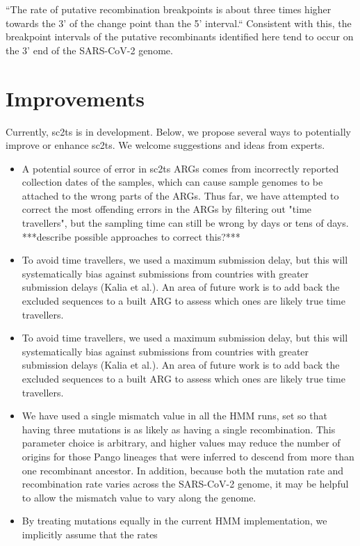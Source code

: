 \documentclass{article}
\begin{document}
“The rate of putative recombination breakpoints is about three times higher
towards the 3' of the change point than the 5' interval.“ Consistent with this,
the breakpoint intervals of the putative recombinants identified here tend to
occur on the 3’ end of the SARS-CoV-2 genome.

\section{Improvements}

Currently, sc2ts is in development. Below, we propose several ways to
potentially improve or enhance sc2ts. We welcome suggestions and ideas from
experts.

\begin{itemize} \item A potential source of error in sc2ts ARGs comes from
incorrectly reported collection dates of the samples, which can cause sample
genomes to be attached to the wrong parts of the ARGs. Thus far, we have
attempted to correct the most offending errors in the ARGs by filtering out
"time travellers", but the sampling time can still be wrong by days or tens of
days. ***describe possible approaches to correct this?*** \item To avoid time
travellers, we used a maximum submission delay, but this will systematically
bias against submissions from countries with greater submission delays (Kalia
et al.). An area of future work is to add back the excluded sequences to a
built ARG to assess which ones are likely true time travellers. \item To avoid
time travellers, we used a maximum submission delay, but this will
systematically bias against submissions from countries with greater submission
delays (Kalia et al.). An area of future work is to add back the excluded
sequences to a built ARG to assess which ones are likely true time travellers.
\item We have used a single mismatch value in all the HMM runs, set so that
having three mutations is as likely as having a single recombination. This
parameter choice is arbitrary, and higher values may reduce the number of
origins for those Pango lineages that were inferred to descend from more than
one recombinant ancestor. In addition, because both the mutation rate and
recombination rate varies across the SARS-CoV-2 genome, it may be helpful to
allow the mismatch value to vary along the genome. \item By treating mutations
equally in the current HMM implementation, we implicitly assume that the rates

\end{itemize}
\end{document}
